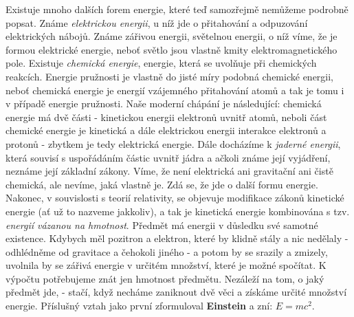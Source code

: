     Existuje mnoho dalších forem energie, které teď samozřejmě nemůžeme podrobně popsat. Známe 
    \emph{elektrickou energii}, u níž jde o přitahování a odpuzování elektrických nábojů. Známe 
    zářivou energii, světelnou energii, o níž víme, že je formou elektrické energie, neboť světlo 
    jsou vlastně kmity elektromagnetického pole. Existuje \emph{chemická energie}, energie, která 
    se uvolňuje při chemických reakcích. Energie pružnosti je vlastně do jisté míry podobná 
    chemické energii, neboť chemická energie je energií vzájemného přitahování atomů a tak je tomu 
    i v případě energie pružnosti. Naše moderní chápání je následující: chemická energie má dvě 
    části - kinetickou energii elektronů uvnitř atomů, neboli část chemické energie je kinetická a 
    dále elektrickou energii interakce elektronů a protonů - zbytkem je tedy elektrická energie. 
    Dále docházíme k \emph{jaderné energii}, která souvisí s uspořádáním částic uvnitř jádra a 
    ačkoli známe její vyjádření, neznáme její základní zákony. Víme, že není elektrická ani 
    gravitační ani čistě chemická, ale nevíme, jaká vlastně je. Zdá se, že jde o další formu 
    energie. Nakonec, v souvislosti s teorií relativity, se objevuje modifikace zákonů kinetické 
    energie (ať už to nazveme jakkoliv), a tak je kinetická energie kombinována s tzv. 
    \emph{energií vázanou na hmotnost}. Předmět má energii v důsledku své samotné existence. 
    Kdybych měl pozitron a elektron, které by klidně stály a nic nedělaly - odhlédněme od gravitace 
    a čehokoli jiného - a potom by se srazily a zmizely, uvolnila by se zářivá energie v určitém 
    množství, které je možné spočítat. K výpočtu potřebujeme znát jen hmotnost předmětu. Nezáleží 
    na tom, o jaký předmět jde, - stačí, když necháme zaniknout dvě věci a získáme určité množství 
    energie. Příslušný vztah jako první zformuloval \textbf{Einstein} a zní: \(E = mc^2\).
    

